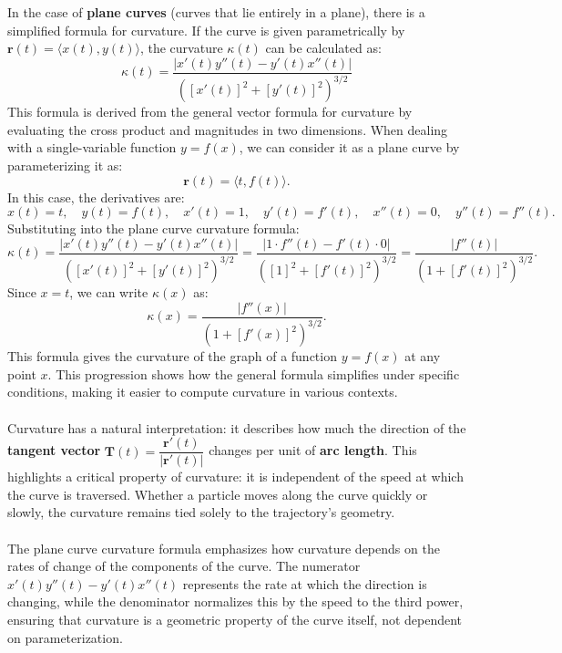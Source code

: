\noindent In the case of \textbf{plane curves} (curves that lie entirely in a plane), there is a simplified formula for curvature. If the curve is given parametrically by \( \mathbf{r}(t) = \langle x(t), y(t) \rangle \), the curvature \( \kappa(t) \) can be calculated as:
\[
\kappa(t) = \frac{|x'(t) y''(t) - y'(t) x''(t)|}{\left( [x'(t)]^2 + [y'(t)]^2 \right)^{3/2}}
\]
This formula is derived from the general vector formula for curvature by evaluating the cross product and magnitudes in two dimensions. When dealing with a single-variable function \( y = f(x) \), we can consider it as a plane curve by parameterizing it as:
\[
\mathbf{r}(t) = \langle t, f(t) \rangle.
\]
In this case, the derivatives are:
\[
x(t) = t, \quad y(t) = f(t), \quad x'(t) = 1, \quad y'(t) = f'(t), \quad x''(t) = 0, \quad y''(t) = f''(t).
\]
Substituting into the plane curve curvature formula:
\[
\kappa(t) = \frac{|x'(t) y''(t) - y'(t) x''(t)|}{\left( [x'(t)]^2 + [y'(t)]^2 \right)^{3/2}} = \frac{|1 \cdot f''(t) - f'(t) \cdot 0|}{\left( [1]^2 + [f'(t)]^2 \right)^{3/2}} = \frac{|f''(t)|}{\left( 1 + [f'(t)]^2 \right)^{3/2}}.
\]
Since \( x = t \), we can write \( \kappa(x) \) as:
\[
\kappa(x) = \frac{|f''(x)|}{\left( 1 + [f'(x)]^2 \right)^{3/2}}.
\]
This formula gives the curvature of the graph of a function \( y = f(x) \) at any point \( x \). This progression shows how the general formula simplifies under specific conditions, making it easier to compute curvature in various contexts. \\ \\ Curvature has a natural interpretation: it describes how much the direction of the \textbf{tangent vector} \( \mathbf{T}(t) = \dfrac{\mathbf{r}'(t)}{|\mathbf{r}'(t)|} \) changes per unit of \textbf{arc length}. This highlights a critical property of curvature: it is independent of the speed at which the curve is traversed. Whether a particle moves along the curve quickly or slowly, the curvature remains tied solely to the trajectory's geometry. \\ \\ The plane curve curvature formula emphasizes how curvature depends on the rates of change of the components of the curve. The numerator \( x'(t) y''(t) - y'(t) x''(t) \) represents the rate at which the direction is changing, while the denominator normalizes this by the speed to the third power, ensuring that curvature is a geometric property of the curve itself, not dependent on parameterization.

